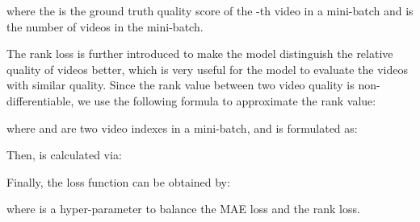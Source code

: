 \documentclass[sigconf]{acmart}
\begin{document}
where the  is the ground truth quality score of the -th video in a mini-batch and  is the number of videos in the mini-batch.

The rank loss is further introduced to make the model distinguish the relative quality of videos better, which is very useful for the model to evaluate the videos with similar quality. Since the rank value between two video quality is non-differentiable, we use the following formula to approximate the rank value:

where  and  are two video indexes in a mini-batch, and  is formulated as:


Then,  is calculated via:



Finally, the loss function can be obtained by:

where  is a hyper-parameter to balance the MAE loss and the rank loss.
\end{document}
